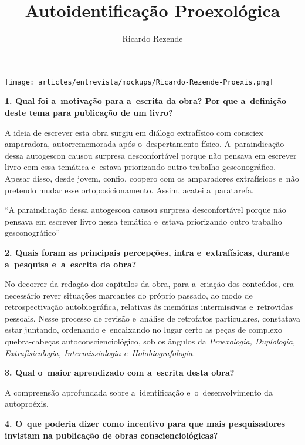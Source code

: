 \documentclass{gescons}
\author{Ricardo Rezende}
\title{Autoidentificação Proexológica}
\begin{document}
    \makeentrevistatitle

    \begin{multicols}{2}


\begin{center}
    \texttt{[image: articles/entrevista/mockups/Ricardo-Rezende-Proexis.png]}
\end{center}

\textbf{1. Qual foi a~motivação para a~escrita da obra? Por que a~definição deste tema para publicação de um livro? }

A ideia de escrever esta obra surgiu em diálogo extrafísico com consciex amparadora, autorrememorada após o~despertamento físico. A~paraindicação dessa autogescon causou surpresa desconfortável porque não pensava em escrever livro com essa temática e~estava priorizando outro trabalho gesconográfico. Apesar disso, desde jovem, confio, coopero com os amparadores extrafísicos e~não pretendo mudar esse ortoposicionamento. Assim, acatei a~paratarefa.

\begin{pullquote}
    ``A paraindicação dessa autogescon causou surpresa desconfortável porque não pensava em escrever livro nessa temática e~estava priorizando outro trabalho gesconográfico''
\end{pullquote}

\textbf{2. Quais foram as principais percepções, intra e~extrafísicas, durante a~pesquisa e~a~escrita da obra? }

No decorrer da redação dos capítulos da obra, para a~criação dos conteúdos, era necessário rever situações marcantes do próprio passado, ao modo de retrospectivação autobiográfica, relativas às memórias intermissivas e~retrovidas pessoais. Nesse processo de revisão e~análise de retrofatos particulares, constatava estar juntando, ordenando e~encaixando no lugar certo as peças de complexo quebra-cabeças autoconscienciológico, sob os ângulos da \textit{Proexologia, Duplologia, Extrafisicologia, Intermissiologia e~Holobiografologia.}

\textbf{3. Qual o~maior aprendizado com a~escrita desta obra? }

A compreensão aprofundada sobre a~identificação e~o~desenvolvimento da autoproéxis.

\textbf{4. O~que poderia dizer como incentivo para que mais pesquisadores invistam na publicação de obras conscienciológicas?}


\end{multicols}
\end{document}
